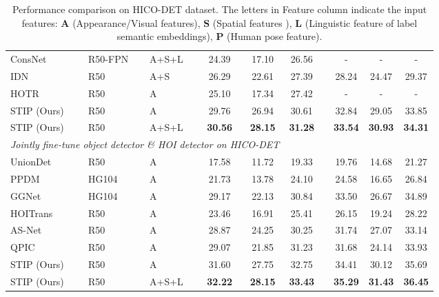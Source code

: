 \documentclass[10pt,twocolumn,letterpaper]{article}
\begin{document}
\begin{table*}[!htb]
\begin{center}
{\begin{tabular}{lllccccccc}
ConsNet \cite{liu2020consnet}  & R50-FPN &A+S+L& 24.39 & 17.10 & 26.56 && - & - & -\\
IDN \cite{li2020hoi}  & R50 &A+S& 26.29 & 22.61 & 27.39 && 28.24 & 24.47 & 29.37 \\
HOTR   \cite{kim2021hotr} & R50 &A& 25.10 & 17.34 & 27.42 && - & - & -\\
\rowcolor{Gray}
STIP (Ours) & R50 &A& 29.76 & 26.94 & 30.61 && 32.84 & 29.05 & 33.85\\
\rowcolor{Gray}
STIP (Ours) & R50 &A+S+L& \textbf{30.56} & \textbf{28.15} & \textbf{31.28} && \textbf{33.54} & \textbf{30.93} & \textbf{34.31}\\
\hline
\multicolumn{5}{l}{\emph{Jointly fine-tune object detector \& HOI detector on HICO-DET}} \\
UnionDet \cite{kim2020uniondet}  & R50 &A& 17.58 & 11.72 & 19.33 && 19.76 & 14.68 & 21.27 \\
PPDM \cite{liao2020ppdm}  & HG104  &A& 21.73 & 13.78 & 24.10 && 24.58 & 16.65 & 26.84\\
GGNet \cite{zhong2021glance} & HG104 &A& 29.17 & 22.13 & 30.84 && 33.50 & 26.67 & 34.89\\
HOITrans \cite{zou2021end} & R50 &A& 23.46 & 16.91 & 25.41 && 26.15 & 19.24 & 28.22 \\
AS-Net \cite{chen2021reformulating}  & R50 &A& 28.87 & 24.25 & 30.25 && 31.74 & 27.07 & 33.14\\
QPIC \cite{tamura2021qpic} & R50 &A& 29.07 & 21.85 & 31.23 && 31.68 & 24.14 & 33.93\\
\rowcolor{Gray}
STIP (Ours) & R50 &A& 31.60 & 27.75 & 32.75 && 34.41 & 30.12 & 35.69 \\
\rowcolor{Gray}
STIP (Ours) & R50  &A+S+L& \textbf{32.22} & \textbf{28.15} & \textbf{33.43} && \textbf{35.29} & \textbf{31.43} & \textbf{36.45} \\
\hline
\end{tabular}}
\end{center}
\vspace{-0.2in}
\caption{Performance comparison on HICO-DET dataset. The letters in Feature column indicate the input features: \textbf{A} (Appearance/Visual features), \textbf{S} (Spatial features \cite{gao2018ican}), \textbf{L} (Linguistic feature of label semantic embeddings), \textbf{P} (Human pose feature).}
\label{tab:hicodet-res}
\vspace{-0.26in}
\end{table*}
\end{document}
